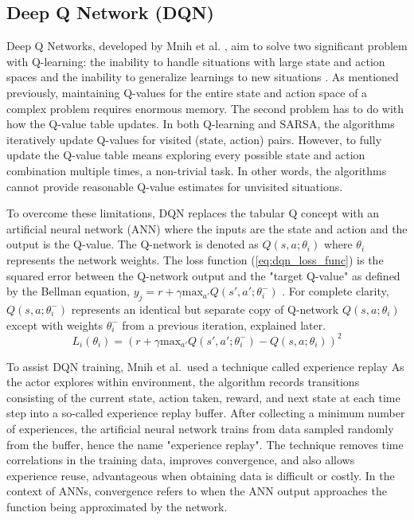 \subsection{Deep Q Network (DQN)}
Deep Q Networks, developed by Mnih et al. \cite{Mnih_2015}, aim to solve two significant problem with Q-learning: the inability to handle situations with large state and action spaces and the inability to generalize learnings to new situations \cite{sutton_policygrad}. As mentioned previously, maintaining Q-values for the entire state and action space of a complex problem requires enormous memory. The second problem has to do with how the Q-value table updates. In both Q-learning and SARSA, the algorithms iteratively update Q-values for visited (state, action) pairs. However, to fully update the Q-value table means exploring every possible state and action combination multiple times, a non-trivial task. In other words, the algorithms cannot provide reasonable Q-value estimates for unvisited situations.

To overcome these limitations, DQN replaces the tabular Q concept with an artificial neural network (ANN) where the inputs are the state and action and the output is the Q-value. The Q-network is denoted as $Q(s,a;\theta_i)$ where $\theta_i$ represents the network weights. The loss function (\ref{eq:dqn_loss_func}) is the squared error between the Q-network output and the "target Q-value" as defined by the Bellman equation, $y_j = r + \gamma \text{max}_{a'}Q(s', a';\theta^-_i)$  \cite{Mnih_2015}. For complete clarity, $Q(s,a;\theta^-_i)$ represents an identical but separate copy of Q-network $Q(s,a;\theta_i)$ except with weights $\theta^-_i$ from a previous iteration, explained later.
\begin{equation}
	\label{eq:dqn_loss_func}
L_i(\theta_i) = (r + \gamma \text{max}_{a'}Q(s', a';\theta^-_i)-Q(s,a;\theta_i))^2
\end{equation}

To assist DQN training, Mnih et al.\ used a technique called experience replay \cite{Mnih_2015} As the actor explores within environment, the algorithm records transitions consisting of the current state, action taken, reward, and next state at each time step into a so-called experience replay buffer. After collecting a minimum number of experiences, the artificial neural network trains from data sampled randomly from the buffer, hence the name "experience replay". The technique removes time correlations in the training data, improves convergence, and also allows experience reuse, advantageous when obtaining data is difficult or costly. In the context of ANNs, convergence refers to when the ANN output approaches the function being approximated by the network.

